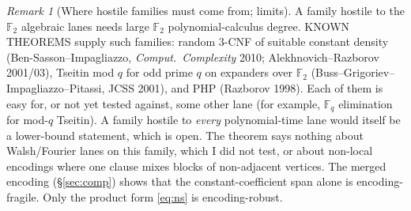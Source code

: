 \documentclass[11pt]{article}
\theoremstyle{definition}
\theoremstyle{remark}
\newtheorem{remark}{Remark}
\newcommand{\F}{\mathbb{F}}
\begin{document}
\begin{remark}[Where hostile families must come from; limits]
A family hostile to the $\F_2$ algebraic lanes needs large $\F_2$ polynomial-calculus degree.
KNOWN THEOREMS supply such families: random 3-CNF of suitable constant density
(Ben-Sasson--Impagliazzo, \emph{Comput.\ Complexity} 2010; Alekhnovich--Razborov 2001/03),
Tseitin mod $q$ for odd prime $q$ on expanders over $\F_2$ (Buss--Grigoriev--Impagliazzo--Pitassi,
JCSS 2001), and PHP (Razborov 1998). Each of them is easy for, or not yet tested against,
some other lane (for example, $\F_q$ elimination for mod-$q$ Tseitin). A family hostile to
\emph{every} polynomial-time lane would itself be a lower-bound statement, which is open. The
theorem says nothing about Walsh/Fourier lanes on this family, which I did not test, or about
non-local encodings where one clause mixes blocks of non-adjacent vertices. The merged
encoding (\S\ref{sec:comp}) shows that the constant-coefficient span alone is
encoding-fragile. Only the product form \eqref{eq:ns} is encoding-robust.
\end{remark}
\end{document}
